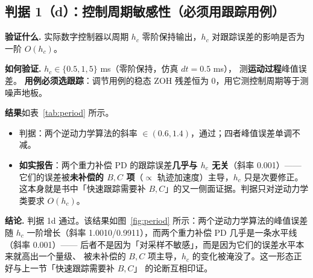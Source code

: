 \documentclass[11pt,a4paper]{ctexart}
\begin{document}
\subsection{判据 1（d）：控制周期敏感性（必须用跟踪用例）}\label{sec:period}

\textbf{验证什么.} 实际数字控制器以周期 $h_c$ 零阶保持输出，$h_c$ 对跟踪误差的影响是否为一阶 $O(h_c)$。

\textbf{如何验证.} $h_c\in\{0.5,1,5\}$ ms（零阶保持，仿真 $dt=0.5$ ms），
测\textbf{运动过程}峰值误差。
\textbf{用例必须选跟踪}：调节用例的稳态 ZOH 残差恒为 0，用它测控制周期等于测噪声地板。

\textbf{结果}如表~\ref{tab:period} 所示。

\begin{table}[H]
\centering
\small
\caption{控制周期对跟踪峰值误差的影响（6R）}\label{tab:period}
\end{table}

\begin{itemize}[leftmargin=1.6em,itemsep=2pt]
\item 判据：两个逆动力学算法的斜率 $\in(0.6,1.4)$，通过；四者峰值误差单调不减。
\item \textbf{如实报告}：两个重力补偿 PD 的跟踪误差\textbf{几乎与 $h_c$ 无关}（斜率 0.001）——
  它们的误差被\textbf{未补偿的 $B,C$ 项}（$\propto$ 轨迹加速度）主导，$h_c$ 只是次要修正。
  这本身就是书中「快速跟踪需要补 $B,C$」的又一侧面证据。判据只对逆动力学类要求 $O(h_c)$。
\end{itemize}

\textbf{结论.} 判据 1d 通过。该结果如图~\ref{fig:period} 所示：两个逆动力学算法的峰值误差随 $h_c$
一阶增长（斜率 1.0010/0.9911），而两个重力补偿 PD 几乎是一条水平线（斜率 0.001）——
后者不是因为「对采样不敏感」，而是因为它们的误差水平本来就高出一个量级、
被未补偿的 $B,C$ 项主导，$h_c$ 的变化被淹没了。这一形态正好与上一节「快速跟踪需要补 $B,C$」
的论断互相印证。
\end{document}

